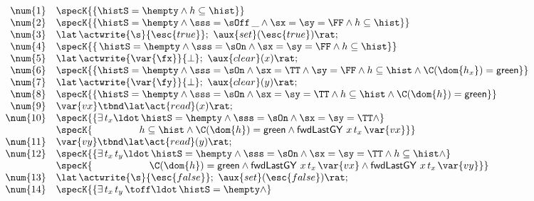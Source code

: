 \begin{figure}[!htp]
\[
  \begin{array}[t]{r l}
  \num{1} & \specK{\{ \histS = \hempty \wedge h \subseteq \hist \}} \\
  \num{2} & \specK{\{ \histS = \hempty \wedge
                \sss = \sOff\, \_ \wedge \sx = \sy = \FF
                \wedge h \subseteq \hist\}}\\
  \num{3} & \lat\,\actwrite{\s}{\esc{true}};\ \aux{set}(\esc{true}) \rat;\\
  \num{4} & \specK{\{\, \histS = \hempty \wedge
              \sss = \sOn \wedge \sx = \sy = \FF \wedge
              h \subseteq \hist \}}\\
  \num{5} & \lat\,\actwrite{\var{\fx}}{\bot};\ \aux{clear}(x)\rat;\\
  \num{6} & \specK{\{
                 \histS = \hempty \wedge \sss= \sOn \wedge \sx = \TT
                 \wedge \sy = \FF \wedge
h \subseteq \hist \wedge
               \C(\dom{h_{x}}) = \mathsf{green}\}}\\
  \num{7} & \lat\,\actwrite{\var{\fy}}{\bot};\ \aux{clear}(y)\rat;\\
  \num{8} & \specK{\{\histS = \hempty \wedge \sss= \sOn \wedge
             \sx = \sy = \TT \wedge
             h \subseteq \hist \wedge \C(\dom{h}) = \mathsf{green}\}}\\
  \num{9} & \var{vx} \tbnd \lat \act{read}(x) \rat;\\
  \num{10} & \specK{\{ \exists\, t_x\ldot\, \histS = \hempty \wedge
                  \sss = \sOn \wedge \sx = \sy = \TT  \wedge}\\
           & \specK{\hphantom{\{ \exists\, t_x\ldot}
                h \subseteq \hist \wedge \C(\dom{h}) = \mathsf{green} \wedge    
                \botLGY\ x\, t_x\, \var{vx} \}} \\
  \num{11} & \var{vy} \tbnd \lat \act{read}(y) \rat;\\
  \num{12} & \specK{\{ \exists\, t_x\, t_y\ldot\, \histS = \hempty \wedge
              \sss = \sOn \wedge \sx = \sy = \TT  \wedge
              h \subseteq \hist \wedge}\\
           & \specK{\hphantom{\{ \exists\, t_x \, t_y\ldot}
             \C(\dom{h}) = \mathsf{green} \wedge    
            \botLGY\ x\, t_x\, \var{vx} \wedge \botLGY\ x\, t_x\, \var{vy}\}} \\
  \num{13} &\lat\,\actwrite{\s}{\esc{false}};\ \aux{set}(\esc{false}) \rat;\\\
  \num{14} & \specK{\{ \exists\, t_x\, t_y\, \toff \ldot\, \histS = \hempty \wedge
}
\end{array}\]
\end{figure}
